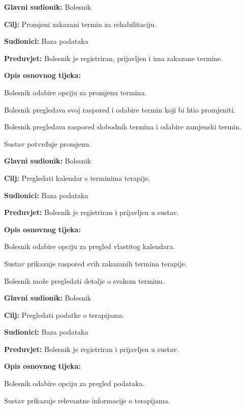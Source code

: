 	\item \textbf{Glavni sudionik:} Bolesnik
	\item \textbf{Cilj:} Promjeni zakazani termin za rehabilitaciju.
	\item \textbf{Sudionici:} Baza podataka
	\item \textbf{Preduvjet:} Bolesnik je registriran, prijavljen i ima zakazane termine.
	\item \textbf{Opis osnovnog tijeka:}
	\begin{packed_enum}
		\item Bolesnik odabire opciju za promjenu termina.
		\item Bolesnik pregledava svoj raspored i odabire termin koji bi htio promjeniti.
		\item Bolesnik pregledava raspored slobodnih termina i odabire zamjenski termin.
		\item Sustav potvrđuje promjenu.
	\end{packed_enum}
\closeusecase

	\item \textbf{Glavni sudionik:} Bolesnik
	\item \textbf{Cilj:} Pregledati kalendar s terminima terapije.
	\item \textbf{Sudionici:} Baza podataka
	\item \textbf{Preduvjet:} Bolesnik je registriran i prijavljen u sustav.
	\item \textbf{Opis osnovnog tijeka:}
	\begin{packed_enum}
		\item Bolesnik odabire opciju za pregled vlastitog kalendara.
		\item Sustav prikazuje raspored svih zakazanih termina terapije.
		\item Bolesnik može pregledati detalje o svakom terminu.
	\end{packed_enum}
\closeusecase

	\item \textbf{Glavni sudionik:} Bolesnik
	\item \textbf{Cilj:} Pregledati podatke o terapijama.
	\item \textbf{Sudionici:} Baza podataka
	\item \textbf{Preduvjet:} Bolesnik je registriran i prijavljen u sustav.
	\item \textbf{Opis osnovnog tijeka:}
	\begin{packed_enum}
		\item Bolesnik odabire opciju za pregled podataka.
		\item Sustav prikazuje relevantne informacije o terapijama.
	\end{packed_enum}
\closeusecase

